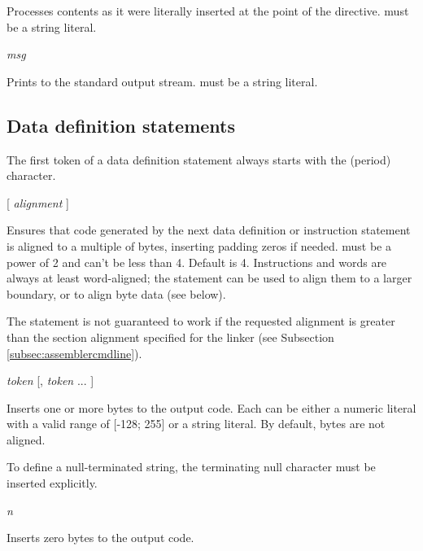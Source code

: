 \documentclass[a4paper,12pt,twoside,extrafontsizes]{memoir}
\begin{document}
Processes  contents as it were literally inserted at the point of the  directive.  must be a string literal.

\begin{codepar}
 \emph{msg}
\end{codepar}

Prints  to the standard output stream.  must be a string literal.

\subsection{Data definition statements}

The first token of a data definition statement always starts with the  (period) character.

\begin{codepar}
 [ \emph{alignment} ]
\end{codepar}

Ensures that code generated by the next data definition or instruction statement is aligned to a multiple of  bytes, inserting padding zeros if needed.  must be a power of 2 and can't be less than 4. Default  is 4. Instructions and words are always at least word-aligned; the  statement can be used to align them to a larger boundary, or to align byte data (see below).

The  statement is not guaranteed to work if the requested alignment is greater than the section alignment specified for the linker (see Subsection \ref{subsec:assemblercmdline}).

\begin{codepar}
 \emph{token} [, \emph{token} ... ]
\end{codepar}

Inserts one or more bytes to the output code. Each  can be either a numeric literal with a valid range of [-128; 255] or a string literal. By default, bytes are not aligned.

To define a null-terminated string, the terminating null character must be inserted explicitly.

\begin{codepar}
 \emph{n}
\end{codepar}

Inserts  zero bytes to the output code.
\end{document}

